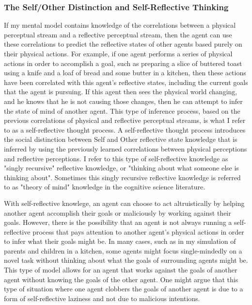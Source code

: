 \subsubsection{The Self/Other Distinction and Self-Reflective Thinking}

If my mental model contains knowledge of the correlations between a
physical perceptual stream and a reflective perceptual stream, then
the agent can use these correlations to predict the reflective states
of other agents based purely on their physical actions. For example,
if one agent performs a series of physical actions in order to
accomplish a goal, such as preparing a slice of buttered toast using a
knife and a loaf of bread and some butter in a kitchen, then these
actions have been correlated with this agent's reflective states,
including the current goals that the agent is pursuing. If this agent
then sees the physical world changing, and he knows that he is not
causing those changes, then he can attempt to infer the state of mind
of another agent. This type of inference process, based on the
previous correlations of physical and reflective perceptual streams,
is what I refer to as a self-reflective thought process. A
self-reflective thought process introduces the social distinction
between Self and Other reflective state knowledge that is inferred by
using the previously learned correlations between physical perceptions
and reflective perceptions. I refer to this type of self-reflective
knowledge as "singly recursive" reflective knowledge, or "thinking
about what someone else is thinking about". Sometimes this singly
recursive reflective knowledge is referred to as "theory of mind"
knowledge in the cognitive science literature.

With self-reflective knowlege, an agent can choose to act
altruistically by helping another agent accomplish their goals or
maliciously by working against their goals. However, there is the
possibility that an agent is not always running a self-reflective
process that pays attention to another agent's physical actions in
order to infer what their goals might be. In many cases, such as in
my simulation of parents and children in a kitchen, some agents might
focus single-mindedly on a novel task without thinking about what the
goals of surrounding agents might be. This type of model allows for an
agent that works against the goals of another agent without knowing
the goals of the other agent. One might argue that this type of
situation where one agent clobbers the goals of another agent is due
to a form of self-reflective laziness and not due to malicious
intentions.

